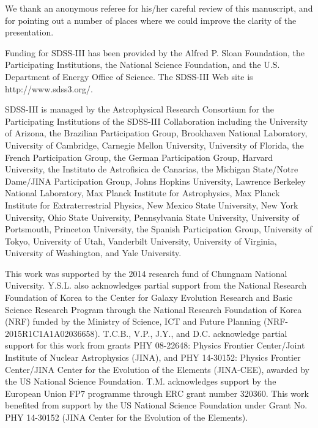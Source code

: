 \documentclass[iop]{emulateapj}
\begin{document}
\acknowledgments

We thank an anonymous referee for his/her careful review of this
manuscript, and for pointing out a number of places where we could
improve the clarity of the presentation.

Funding for SDSS-III has been provided by the Alfred P. Sloan Foundation, the
Participating Institutions, the National Science Foundation, and the U.S.
Department of Energy Office of Science. The SDSS-III Web site is
http://www.sdss3.org/.

SDSS-III is managed by the Astrophysical Research Consortium for the
Participating Institutions of the SDSS-III Collaboration including
the University of Arizona, the Brazilian Participation Group,
Brookhaven National Laboratory, University of Cambridge, Carnegie
Mellon University, University of Florida, the French Participation
Group, the German Participation Group, Harvard University, the
Instituto de Astrofisica de Canarias, the Michigan State/Notre
Dame/JINA Participation Group, Johns Hopkins University, Lawrence
Berkeley National Laboratory, Max Planck Institute for Astrophysics,
Max Planck Institute for Extraterrestrial Physics, New Mexico State
University, New York University, Ohio State University, Pennsylvania
State University, University of Portsmouth, Princeton University,
the Spanish Participation Group, University of Tokyo, University of
Utah, Vanderbilt University, University of Virginia, University of
Washington, and Yale University.

This work was supported by the 2014 research fund of Chungnam National
University. Y.S.L. also acknowledges partial support from the National
Research Foundation of Korea to the Center for Galaxy Evolution Research
and Basic Science Research Program through the National Research
Foundation of Korea (NRF) funded by the Ministry of Science, ICT and 
Future Planning (NRF-2015R1C1A1A02036658). T.C.B., V.P., J.Y., and D.C.
acknowledge partial support for this work from grants PHY 08-22648:
Physics Frontier Center/Joint Institute of Nuclear Astrophysics (JINA),
and PHY 14-30152: Physics Frontier Center/JINA Center for the Evolution
of the Elements (JINA-CEE), awarded by the US National Science
Foundation. T.M. acknowledges support by the European Union FP7 programme
through ERC grant number 320360. This work benefited from support by the
US National Science Foundation under Grant No. PHY 14-30152 (JINA Center
for the Evolution of the Elements).
\end{document}
